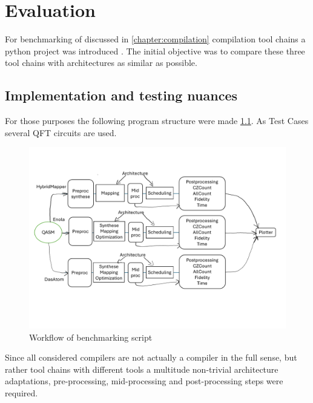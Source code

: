 
\chapter{Evaluation}\label{chapter:evaluation}
For benchmarking of discussed in \ref{chapter:compilation} compilation tool chains a python project was introduced \parencite{Emil_Khusainov_Bachelor_GIT}.
The initial objective was to compare these three tool chains with architectures as similar as possible.
\section{Implementation and testing nuances}
For those purposes the following program structure were made \ref{fig:overview}.
As Test Cases several \ac{QFT} circuits are used.
\begin{figure}[htbp]
  \centering
    \includegraphics[width=1.0\textwidth]{figures/schema.pdf}
    \caption{Workflow of benchmarking script}
    \label{fig:overview}
\end{figure}
Since all considered compilers are not actually a compiler in the full sense, but rather tool chains with different tools
a multitude non-trivial architecture adaptations, pre-processing, mid-processing and post-processing steps were required. 

